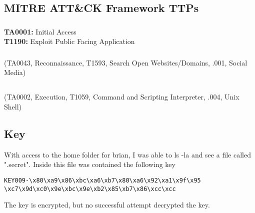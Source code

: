 \documentclass[notitlepage]{article}
\begin{document}
    \subsection{MITRE ATT{\&}CK Framework TTPs}
        
	
	\subsubsection*{}
	\indent\textbf{TA0001:} Initial Access \\
    \indent\indent\textbf{T1190:} Exploit Public Facing Application \\
    
	\subsubsection*{}
	\ttp(TA0043, Reconnaissance, T1593, Search Open Websites/Domains, .001, Social Media)

    \subsection*{}
	\ttp(TA0002, Execution, T1059, Command and Scripting Interpreter, .004, Unix Shell)


    \subsection{Key}
        With access to the home folder for brian, I was able to ls -la and see a file called ".secret". Inside this file was contained the following key
        \begin{verbatim}
KEY009-\x80\xa9\x86\xbc\xa6\xb7\x80\xa6\x92\xa1\x9f\x95
\xc7\x9d\xc0\x9e\xbc\x9e\xb2\x85\xb7\x86\xcc\xcc
        \end{verbatim}
        The key is encrypted, but no successful attempt decrypted the key.
\end{document}
